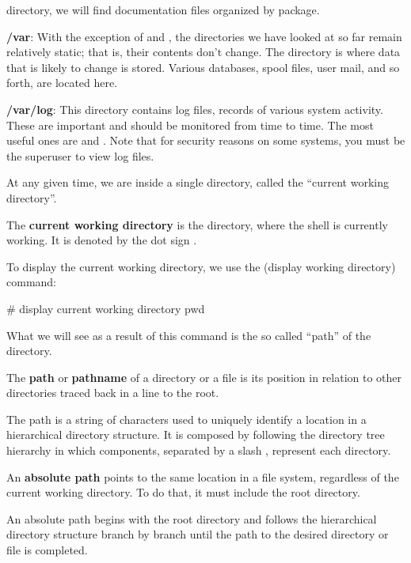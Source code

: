directory, we will find documentation files organized by package.
\item \textbf{/var}: With the exception of  and , the directories we have looked at so far
remain relatively static; that is, their contents don't change. The  directory is where data that is likely
to change is stored. Various databases, spool files, user mail, and so forth, are located here.
\item \textbf{/var/log}: This directory contains log files, records of various system activity. These are important and
should be monitored from time to time. The most useful ones are  and .
Note that for security reasons on some systems, you must be the superuser to view log files.
\eit


At any given time, we are inside a single directory, called the ``current working directory''.

The \textbf{current working directory} is the directory, where the shell is currently working. It is denoted by the dot
sign .
\ed

To display the current working directory, we use the  (display working directory) command:
\begin{bash}
# display current working directory
pwd
\end{bash}

What we will see as a result of this command is the so called ``path'' of the directory.

The \textbf{path} or \textbf{pathname} of a directory or a file is its position in relation to other directories traced
back in a line to the root.
\ed

The path is a string of characters used to uniquely identify a location in a hierarchical directory structure. It is
composed by following the directory tree hierarchy in which components, separated by a slash \code{/}, represent each
directory.

An \textbf{absolute path} points to the same location in a file system, regardless of the current working directory.
To do that, it must include the root directory.
\ed

An absolute path begins with the root directory and follows the hierarchical directory structure branch by branch
until the path to the desired directory or file is completed.

